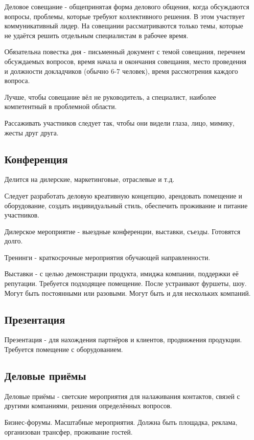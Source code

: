 \documentclass[a4paper,14pt]{extarticle}
\begin{document}
Деловое совещание - общепринятая форма делового общения, когда обсуждаются вопросы, проблемы, которые требуют коллективного решения. В этом участвует коммуникативный лидер. На совещании рассматриваются только темы, которые не удаётся решить отдельным специалистам в рабочее время.

Обязательна повестка дня - письменный документ с темой совещания, перечнем обсуждаемых вопросов, время начала и окончания совещания, место проведения и должности докладчиков (обычно 6-7 человек), время рассмотрения каждого вопроса.

Лучше, чтобы совещание вёл не руководитель, а специалист, наиболее компетентный в проблемной области.

Рассаживать участников следует так, чтобы они видели глаза, лицо, мимику, жесты друг друга.

\subsection{Конференция}

Делится на дилерские, маркетинговые, отраслевые и т.д.

Следует разработать деловую креативную концепцию, арендовать помещение и оборудование, создать индивидуальный стиль, обеспечить проживание и питание участников.

Дилерское мероприятие - выездные конференции, выставки, съезды. Готовятся долго.

Тренинги - краткосрочные мероприятия обучающей направленности.

Выставки - с целью демонстрации продукта, имиджа компании, поддержки её репутации. Требуется подходящее помещение. После устраивают фуршеты, шоу. Могут быть постоянными или разовыми. Могут быть и для нескольких компаний.

\subsection{Презентация}

Презентация - для нахождения партнёров и клиентов, продвижения продукции. Требуется помещение с оборудованием.

\subsection{Деловые приёмы}

Деловые приёмы - светские мероприятия для налаживания контактов, связей с другими компаниями, решения определённых вопросов.

Бизнес-форумы. Масштабные мероприятия. Должна быть площадка, реклама, организован трансфер, проживание гостей.
\end{document}
